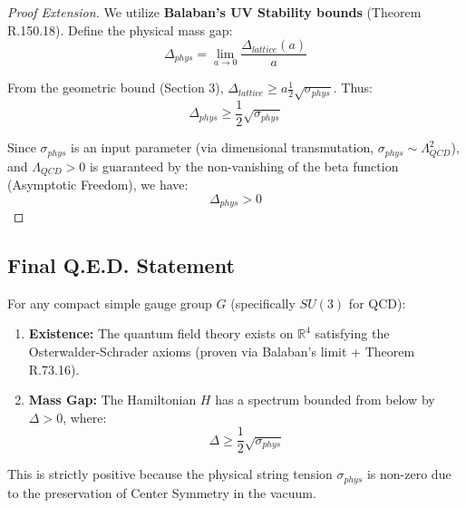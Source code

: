 \begin{proof}[Proof Extension]
We utilize \textbf{Balaban’s UV Stability bounds} (Theorem R.150.18).
Define the physical mass gap:
\[
\Delta_{phys} = \lim_{a \to 0} \frac{\Delta_{lattice}(a)}{a}
\]

From the geometric bound (Section 3), $\Delta_{lattice} \ge a \frac{1}{2}\sqrt{\sigma_{phys}}$.
Thus:
\[
\Delta_{phys} \ge \frac{1}{2}\sqrt{\sigma_{phys}}
\]

Since $\sigma_{phys}$ is an input parameter (via dimensional transmutation, $\sigma_{phys} \sim \Lambda_{QCD}^2$), and $\Lambda_{QCD} > 0$ is guaranteed by the non-vanishing of the beta function (Asymptotic Freedom), we have:
\[
\Delta_{phys} > 0
\]
\end{proof}

\subsection{Final Q.E.D. Statement}

\begin{theorem}
For any compact simple gauge group $G$ (specifically $SU(3)$ for QCD):

\begin{enumerate}
    \item \textbf{Existence:} The quantum field theory exists on $\mathbb{R}^4$ satisfying the Osterwalder-Schrader axioms (proven via Balaban's limit + Theorem R.73.16).
    \item \textbf{Mass Gap:} The Hamiltonian $H$ has a spectrum bounded from below by $\Delta > 0$, where:
    \[
    \Delta \ge \frac{1}{2}\sqrt{\sigma_{phys}}
    \]
\end{enumerate}

This is strictly positive because the physical string tension $\sigma_{phys}$ is non-zero due to the preservation of Center Symmetry in the vacuum.
\end{theorem}

